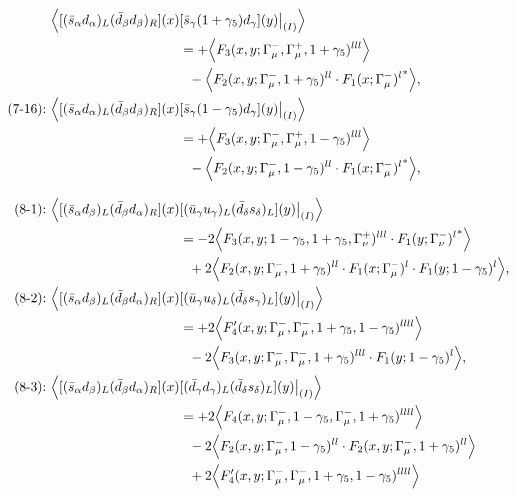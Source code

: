 \begin{align}
\Big\langle
[(\bar s_\alpha d_\alpha)_L(\bar d_\beta d_\beta)_R](x)&
[\bar s_\gamma (1 + \gamma_5) d_\gamma](y)\big|_{(I)}
\Big\rangle
\notag\\*
&=
 + \Big\langle F_3(x,y;\Gamma_\mu^-,\Gamma_\mu^+,1+\gamma_5)^{lll}\Big\rangle
\notag\\*&\ \ 
 - \Big\langle F_2(x,y;\Gamma_\mu^-,1+\gamma_5)^{ll} \cdot {F_1(x;\Gamma_\mu^-)^l}^*\Big\rangle,
\\
\mbox{(7-16):}\ 
\Big\langle
[(\bar s_\alpha d_\alpha)_L(\bar d_\beta d_\beta)_R](x)&
[\bar s_\gamma (1 - \gamma_5) d_\gamma](y)\big|_{(I)}
\Big\rangle
\notag\\*
&=
 + \Big\langle F_3(x,y;\Gamma_\mu^-,\Gamma_\mu^+,1-\gamma_5)^{lll}\Big\rangle
\notag\\*&\ \ 
 - \Big\langle F_2(x,y;\Gamma_\mu^-,1-\gamma_5)^{ll} \cdot {F_1(x;\Gamma_\mu^-)^l}^*\Big\rangle,
\\[3mm]
\mbox{(8-1):}\ 
\Big\langle
[(\bar s_\alpha d_\beta)_L(\bar d_\beta d_\alpha)_R](x)&
[(\bar u_\gamma u_\gamma)_L(\bar d_\delta s_\delta)_L](y)\big|_{(I)}
\Big\rangle
\notag\\*
&=
-2\Big\langle F_3(x,y;1-\gamma_5,1+\gamma_5,\Gamma_\nu^+)^{lll} \cdot {F_1(y;\Gamma_\nu^-)^l}^*\Big\rangle
\notag\\*&\ \ 
 + 2\Big\langle F_2(x,y;\Gamma_\mu^-,1+\gamma_5)^{ll} \cdot F_1(x;\Gamma_\mu^-)^l \cdot F_1(y;1-\gamma_5)^l\Big\rangle,
\\
\mbox{(8-2):}\ 
\Big\langle
[(\bar s_\alpha d_\beta)_L(\bar d_\beta d_\alpha)_R](x)&
[(\bar u_\gamma u_\delta)_L(\bar d_\delta s_\gamma)_L](y)\big|_{(I)}
\Big\rangle
\notag\\*
&=
 + 2\Big\langle F_4'(x,y;\Gamma_\mu^-,\Gamma_\mu^-,1+\gamma_5,1-\gamma_5)^{llll}\Big\rangle
\notag\\*&\ \ 
-2\Big\langle F_3(x,y;\Gamma_\mu^-,\Gamma_\mu^-,1+\gamma_5)^{lll} \cdot F_1(y;1-\gamma_5)^l\Big\rangle,
\\
\mbox{(8-3):}\ 
\Big\langle
[(\bar s_\alpha d_\beta)_L(\bar d_\beta d_\alpha)_R](x)&
[(\bar d_\gamma d_\gamma)_L(\bar d_\delta s_\delta)_L](y)\big|_{(I)}
\Big\rangle
\notag\\*
&=
 + 2\Big\langle F_4(x,y;\Gamma_\mu^-,1-\gamma_5,\Gamma_\mu^-,1+\gamma_5)^{llll}\Big\rangle
\notag\\*&\ \ 
-2\Big\langle F_2(x,y;\Gamma_\mu^-,1-\gamma_5)^{ll} \cdot F_2(x,y;\Gamma_\mu^-,1+\gamma_5)^{ll}\Big\rangle
\notag\\*&\ \ 
 + 2\Big\langle F_4'(x,y;\Gamma_\mu^-,\Gamma_\mu^-,1+\gamma_5,1-\gamma_5)^{llll}\Big\rangle

\end{align}
